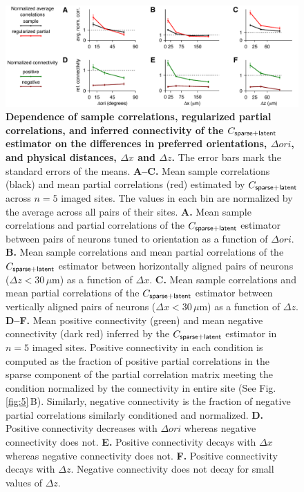 \documentclass[10pt]{article}
\newcommand{\figref}[2]{Fig.\;\ref{fig:#1}\,#2}
\begin{document}
\begin{figure}[!ht]
    \begin{center}
        \includegraphics{./figures/Figure06.pdf}
    \end{center}
    \caption{{\bf Dependence of sample correlations, regularized partial correlations, and inferred connectivity of the $C_{\sf sparse+latent}$ estimator on the differences in preferred orientations, $\Delta ori$, and physical distances, $\Delta x$ and $\Delta z$.} The error bars mark the standard errors of the means.
    {\bf A--C.} Mean sample correlations (black) and mean partial correlations (red) estimated by $C_{\sf sparse+latent}$ across $n=5$ imaged sites. The values in each bin are normalized by the average across all pairs of their sites.
    {\bf A.} Mean sample correlations and partial correlations of the $C_{\sf sparse+latent}$ estimator between pairs of neurons tuned to orientation as a function of $\Delta ori$.
    {\bf B.} Mean sample correlations and mean partial correlations of the $C_{\sf sparse+latent}$ estimator between horizontally aligned pairs of neurons ($\Delta z<30\,\mu$m) as a function of $\Delta x$.
    {\bf C.} Mean sample correlations and mean partial correlations of the $C_{\sf sparse+latent}$ estimator between vertically aligned pairs of neurons ($\Delta x<30\,\mu$m) as a function of $\Delta z$.
    {\bf D--F.} Mean positive connectivity (green) and mean negative connectivity (dark red) inferred by the $C_{\sf sparse+latent}$ estimator in $n=5$ imaged sites. Positive connectivity in each condition is computed as the fraction of positive partial correlations in the sparse component of the partial correlation matrix meeting the condition normalized by the connectivity in entire site (See \figref{5}{B}). Similarly, negative connectivity is the fraction of negative partial correlations similarly conditioned and normalized.
    {\bf D.} Positive connectivity decreases with $\Delta ori$ whereas negative connectivity does not.
    {\bf E.} Positive connectivity decays with $\Delta x$ whereas negative connectivity does not. 
    {\bf F.} Positive connectivity decays with $\Delta z$. Negative connectivity does not decay for small values of $\Delta z$.
    }
\label{fig:6}
\end{figure}
\end{document}
